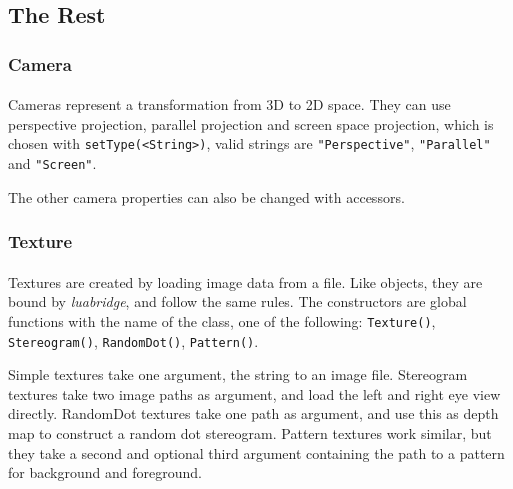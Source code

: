 \subsection{The Rest}
\subsubsection{Camera}
\paragraph{}
Cameras represent a transformation from 3D to 2D space.
They can use perspective projection, parallel projection and screen space projection, which is chosen with \texttt{setType(<String>)}, valid strings are \texttt{"Perspective"}, \texttt{"Parallel"} and \texttt{"Screen"}.

The other camera properties can also be changed with accessors.

\subsubsection{Texture}
\paragraph{}
Textures are created by loading image data from a file.
Like objects, they are bound by \textit{luabridge}, and follow the same rules.
The constructors are global functions with the name of the class, one of the following:
\texttt{Texture()}, \texttt{Stereogram()}, \texttt{RandomDot()}, \texttt{Pattern()}.

Simple textures take one argument, the string to an image file.
Stereogram textures take two image paths as argument, and load the left and right eye view directly.
RandomDot textures take one path as argument, and use this as depth map to construct a random dot stereogram.
Pattern textures work similar, but they take a second and optional third argument containing the path to a pattern for background and foreground.

